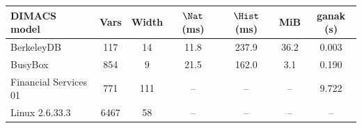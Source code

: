 {\footnotesize
\begin{tabular*}{\textwidth}{@{\extracolsep{\fill}}lS[table-format=4.0]S[table-format=3.0]S[table-format=3.1]S[table-format=3.1]S[table-format=2.1]S[table-format=1.3]@{}}
\toprule
DIMACS model & {Vars} & {Width} & {$\Nat$ (ms)} & {$\Hist$ (ms)} & {MiB} & {ganak (s)} \\
\midrule
BerkeleyDB & 117 & 14 & 11.8 & 237.9 & 36.2 & 0.003 \\
BusyBox & 854 & 9 & 21.5 & 162.0 & 3.1 & 0.190 \\
\addlinespace
Financial Services 01 & 771 & 111 & {--} & {--} & {--} & 9.722 \\
Linux 2.6.33.3 & 6467 & 58 & {--} & {--} & {--} & {--} \\
\bottomrule
\end{tabular*}}
